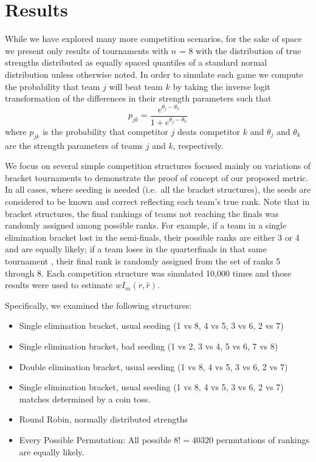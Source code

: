 \documentclass[
  12pt,
]{article}
\providecommand{\tightlist}{%
  \setlength{\itemsep}{0pt}\setlength{\parskip}{0pt}}
\begin{document}
\section{Results}\label{results}

While we have explored many more competition scenarios, for the sake of
space we present only results of tournaments with \(n\) = 8 with the
distribution of true strengths distributed as equally spaced quantiles
of a standard normal distribution unless otherwise noted. In order to
simulate each game we compute the probability that team \(j\) will beat
team \(k\) by taking the inverse logit transformation of the differences
in their strength parameters such that\\
\[
p_{jk} = \frac{e^{\theta_j - \theta_k}}{1 + e^{\theta_j - \theta_k}}
\] where \(p_{jk}\) is the probability that competitor \(j\) deats
competitor \(k\) and \(\theta_j\) and \(\theta_k\) are the strength
parameters of teams \(j\) and \(k\), respectively.

We focus on several simple competition structures focused mainly on
variations of bracket tournaments to demonstrate the proof of concept of
our proposed metric. In all cases, where seeding is needed (i.e.~all the
bracket structures), the seeds are considered to be known and correct
reflecting each team's true rank. Note that in bracket structures, the
final rankings of teams not reaching the finals was randomly assigned
among possible ranks. For example, if a team in a single elimination
bracket lost in the semi-finals, their possible ranks are either 3 or 4
and are equally likely; if a team loses in the quarterfinals in that
same tournament , their final rank is randomly assigned from the set of
ranks 5 through 8. Each competition structure was simulated 10,000 times
and those results were used to estimate \(wI_m(r,\hat{r})\).

Specifically, we examined the following structures:

\begin{itemize}
\tightlist
\item
  Single elimination bracket, usual seeding (1 vs 8, 4 vs 5, 3 vs 6, 2
  vs 7)
\item
  Single elimination bracket, bad seeding (1 vs 2, 3 vs 4, 5 vs 6, 7 vs
  8)
\item
  Double elimination bracket, usual seeding (1 vs 8, 4 vs 5, 3 vs 6, 2
  vs 7)
\item
  Single elimination bracket, usual seeding (1 vs 8, 4 vs 5, 3 vs 6, 2
  vs 7) matches determined by a coin toss.\\
\item
  Round Robin, normally distributed strengths
\item
  Every Possible Permutation: All possible \(8! = 40320\) permutations
  of rankings are equally likely.
\end{itemize}
\end{document}
